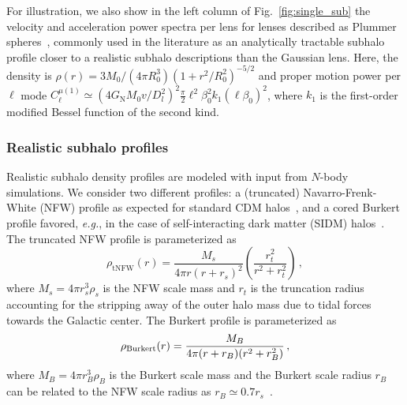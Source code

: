 \documentclass[prd,aps,10pt,nofootinbib,twocolumn,superscriptaddress,preprintnumbers,balancelastpage,longbibliography]{revtex4-1}
\newcommand{\GN}{G_\mathrm{N}}
\begin{document}
For illustration, we also show in the left column of Fig.~\ref{fig:single_sub} the velocity and acceleration power spectra per lens for lenses described as Plummer spheres~\cite{Plummer:1911zza}, commonly used in the literature as an analytically tractable subhalo profile closer to a realistic subhalo descriptions than the Gaussian lens. Here, the density is $\rho(r)= 3M_0/(4\pi R_0^3)(1 + r^2/R_0^2)^{-5/2}$ and proper motion power per $\ell$ mode $C_{\ell}^{\mu (1)} \simeq \left({4 \GN M_0 v/D_l^2}\right)^2 \frac{\pi}{2} \ell^2\beta_0^2 k_1(\ell \beta_0)^2$, where $k_1$ is the first-order modified Bessel function of the second kind.

\subsubsection{Realistic subhalo profiles}

Realistic subhalo density profiles are modeled with input from $N$-body simulations. We consider two different profiles: a (truncated) Navarro-Frenk-White (NFW) profile as expected for standard CDM halos~\cite{Navarro:1995iw,2008gady.book.....B}, and a cored Burkert profile favored, \emph{e.g.}, in the case of self-interacting dark matter (SIDM) halos~\cite{Burkert:1995yz}. The truncated NFW profile is parameterized as
\begin{equation}
\rho_\text{tNFW}(r)=\frac{M_s}{4\pi r(r + r_s)^2}\left(\frac{r_t^2}{r^2 + r_t^2}\right)\,,
\end{equation}
where $M_s = 4\pi r_s^3\rho_s$ is the NFW scale mass and $r_t$ is the truncation radius accounting for the stripping away of the outer halo mass due to tidal forces towards the Galactic center. The Burkert profile is parameterized as
\begin{equation}
\rho_{\rm Burkert}(r) = \frac{M_B}{4\pi(r+r_B)(r^2 + r_B^2)}\,,
\end{equation}
where $M_B = 4\pi r_B^3\rho_B$ is the Burkert scale mass and  the Burkert scale radius $r_B$ can be related to the NFW scale radius as $r_B \simeq 0.7 r_s$~\cite{Bartels:2015uba,Lisanti:2017qoz}.
\end{document}
